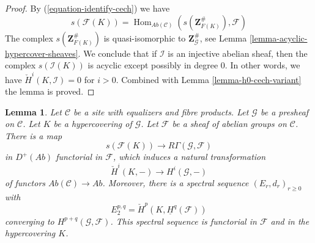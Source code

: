 \documentclass{stacks-project}
\theoremstyle{plain}
\newtheorem{lemma}[subsection]{Lemma}
\theoremstyle{definition}
\theoremstyle{remark}
\numberwithin{equation}{subsection}
\def\Hom{\mathop{\mathrm{Hom}}\nolimits}
\begin{document}
\begin{proof}
By (\ref{equation-identify-cech}) we have
$$
s(\mathcal{F}(K))
=
\Hom_{\textit{Ab}(\mathcal{C})}(s(\mathbf{Z}_{F(K)}^\#), \mathcal{F})
$$
The complex $s(\mathbf{Z}_{F(K)}^\#)$ is quasi-isomorphic
to $\mathbf{Z}_\mathcal{G}^\#$, see
Lemma \ref{lemma-acyclic-hypercover-sheaves}. We conclude
that if $\mathcal{I}$ is an injective abelian sheaf, then
the complex $s(\mathcal{I}(K))$ is acyclic except possibly in degree $0$.
In other words, we have $\check{H}^i(K, \mathcal{I}) = 0$
for $i > 0$. Combined with Lemma \ref{lemma-h0-cech-variant}
the lemma is proved.
\end{proof}

\begin{lemma}
\label{lemma-cech-spectral-sequence-variant}
Let $\mathcal{C}$ be a site with equalizers and fibre products.
Let $\mathcal{G}$ be a presheaf on $\mathcal{C}$.
Let $K$ be a hypercovering of $\mathcal{G}$.
Let $\mathcal{F}$ be a sheaf of abelian groups on $\mathcal{C}$.
There is a map
$$
s(\mathcal{F}(K)) \longrightarrow R\Gamma(\mathcal{G}, \mathcal{F})
$$
in $D^{+}(\textit{Ab})$ functorial in $\mathcal{F}$, which induces
a natural transformation
$$
\check{H}^i(K, -) \longrightarrow H^i(\mathcal{G}, -)
$$
of functors $\textit{Ab}(\mathcal{C}) \to \textit{Ab}$. Moreover,
there is a spectral sequence $(E_r, d_r)_{r \geq 0}$ with
$$
E_2^{p, q} = \check{H}^p(K, \underline{H}^q(\mathcal{F}))
$$
converging to $H^{p + q}(\mathcal{G}, \mathcal{F})$.
This spectral sequence is functorial in $\mathcal{F}$ and
in the hypercovering $K$.
\end{lemma}
\end{document}
